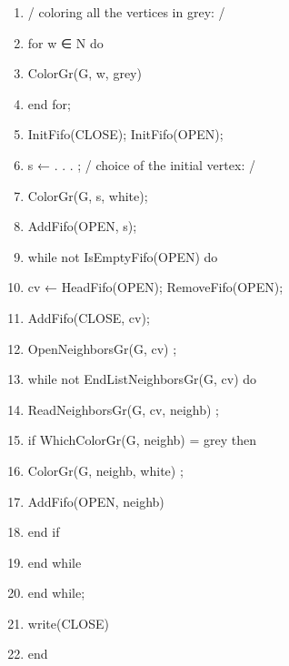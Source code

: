 \documentclass{book} %
\begin{document}
\begin{latin}
    
    \begin{enumerate}
        
        \item / coloring all the vertices in grey: /
        \item for w ∈ N do
        \item   ColorGr(G, w, grey)
        \item end for;
        \item InitFifo(CLOSE); InitFifo(OPEN);
        \item s ← . . . ; / choice of the initial vertex: /
        \item ColorGr(G, s, white);
        \item AddFifo(OPEN, s);
        \item while not IsEmptyFifo(OPEN) do
        \item   cv ← HeadFifo(OPEN); RemoveFifo(OPEN);
        \item   AddFifo(CLOSE, cv);
        \item   OpenNeighborsGr(G, cv) ;
        \item   while not EndListNeighborsGr(G, cv) do
        \item   ReadNeighborsGr(G, cv, neighb) ;
        \item   if WhichColorGr(G, neighb) = grey then
        \item       ColorGr(G, neighb, white) ;
        \item       AddFifo(OPEN, neighb)
        \item   end if
        \item end while
        \item end while;
        \item write(CLOSE) 
        \item end
        
        
    \end{enumerate}
    
\end{latin}
\end{document}
